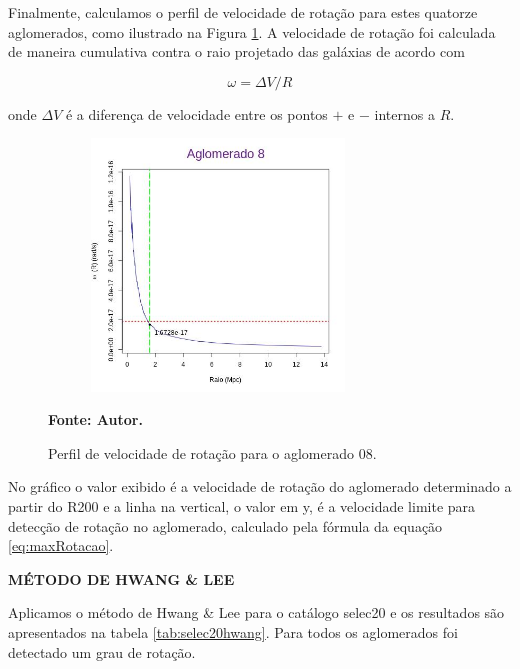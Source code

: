Finalmente, calculamos o perfil de velocidade de rotação para estes quatorze aglomerados, como ilustrado na Figura \ref{selec20rotacao}. A velocidade de rotação foi calculada de maneira cumulativa contra o raio projetado das galáxias de acordo com

\begin{equation}
\omega= \Delta V/R
\label{eq:eq10}
\end{equation}

\noindent onde $\Delta V$ é a diferença de velocidade entre os pontos $+$ e $-$ internos a $R$.

\begin{figure}[H] %
\vspace{-2pt}
\begin{center}
\includegraphics[height=6.7cm,width=9cm]{04-figuras/selec20rotacao}%
\caption{Perfil de velocidade de rotação para o aglomerado 08.}
\textbf{Fonte: Autor.}
\label{selec20rotacao}%
\end{center}
\end{figure}

No gráfico o valor exibido é a velocidade de rotação do aglomerado determinado a partir do R200 e a linha na vertical, o valor em y, é a velocidade limite para detecção de rotação no aglomerado, calculado pela fórmula da equação \ref{eq:maxRotacao}. 

\textbf{MÉTODO DE HWANG \& LEE}

Aplicamos o método de Hwang \& Lee para o catálogo selec20 e os resultados são apresentados na tabela \ref{tab:selec20hwang}. Para todos os aglomerados foi detectado um grau de rotação.

